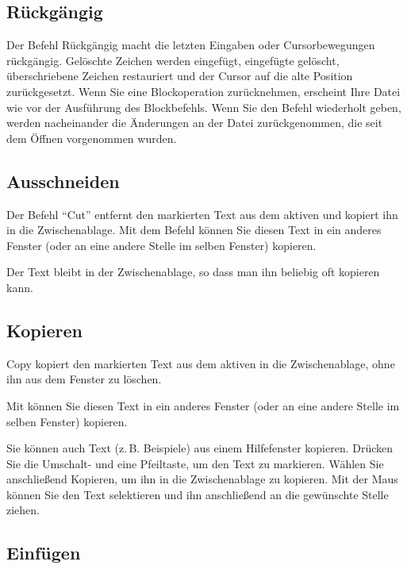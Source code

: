 \subsection{Rückgängig}
\label{sec:MI_UNDO}

Der Befehl Rückgängig macht die letzten Eingaben oder Cursorbewegungen
rückgängig. Gelöschte Zeichen werden eingefügt, eingefügte gelöscht,
überschriebene Zeichen restauriert und der Cursor auf die alte
Position zurückgesetzt. Wenn Sie eine Blockoperation zurücknehmen,
erscheint Ihre Datei wie vor der Ausführung des Blockbefehls. Wenn Sie
den Befehl wiederholt geben, werden nacheinander die Änderungen an der
Datei zurückgenommen, die seit dem Öffnen vorgenommen wurden.

\subsection{Ausschneiden}\label{sec:MI_CUT}
Der Befehl "`Cut"' entfernt den markierten Text aus dem aktiven
 und kopiert ihn in
die Zwischenablage. Mit dem Befehl 
können Sie diesen Text in ein anderes Fenster (oder an eine andere
Stelle im selben Fenster) kopieren.

Der Text bleibt in der Zwischenablage, so dass man ihn beliebig 
oft kopieren kann. 


\subsection{Kopieren}\label{sec:MI_COPY}
Copy kopiert den markierten Text aus dem aktiven
 in die Zwischenablage, ohne ihn
aus dem Fenster zu löschen.

Mit  können Sie diesen Text in ein 
anderes Fenster (oder an eine andere Stelle im selben Fenster) 
kopieren.  

Sie können auch Text (z.\,B. Beispiele) aus einem Hilfefenster 
kopieren. Drücken Sie die Umschalt- und eine Pfeiltaste, um 
den Text zu markieren. Wählen Sie anschließend Kopieren, 
um ihn in die Zwischenablage zu kopieren. Mit der Maus können 
Sie den Text selektieren und ihn anschließend an die gewünschte 
Stelle ziehen.


\subsection{Einfügen}
\label{sec:MI_PASTE}

